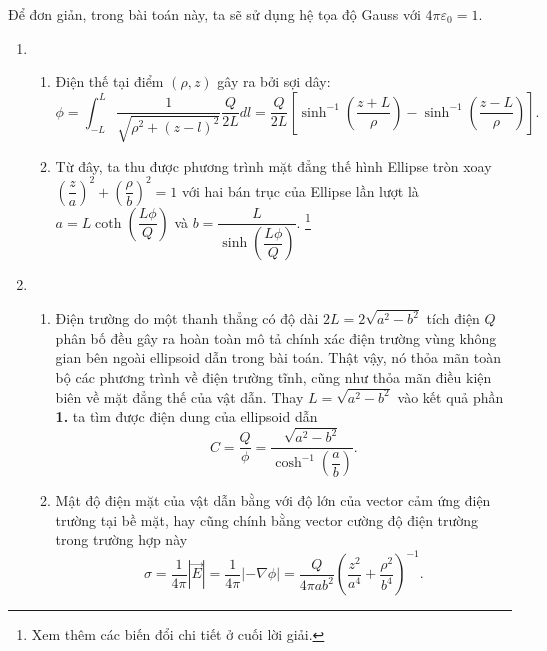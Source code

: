Để đơn giản, trong bài toán này, ta sẽ sử dụng hệ tọa độ Gauss với $4 \pi \varepsilon_0 = 1$.
\begin{enumerate}
    \item 
    \begin{enumerate}[label=\textbf{\alph*,}]\itemsep0em
        \item Điện thế tại điểm $(\rho,z)$ gây ra bởi sợi dây:
    \begin{equation} \label{eq1_ellipsoid_conductor}
        \phi = \int_{-L}^{L} \dfrac{1}{\sqrt{\rho^2+(z-l)^2}} \dfrac{Q}{2L} dl = \dfrac{Q}{2L} \left[ \sinh^{-1}\left(\dfrac{z+L}{\rho}\right)-\sinh^{-1}\left(\dfrac{z-L}{\rho}\right) \right].
    \end{equation}
    \item 
    Từ đây, ta thu được phương trình mặt đẳng thế hình Ellipse tròn xoay $ \left( \dfrac{z}{a} \right)^2 + \left( \dfrac{\rho}{b} \right)^2 = 1$ với hai bán trục của Ellipse lần lượt là $a = L \coth \left( \dfrac{L \phi}{Q} \right)$ và $b = \dfrac{L}{ \sinh \left( \dfrac{L \phi}{Q} \right)}$. \footnote{Xem thêm các biến đổi chi tiết ở cuối lời giải.} \\
    \end{enumerate}
    \item
    \begin{enumerate}[label=\textbf{\alph*,}]\itemsep0em
        \item Điện trường do một thanh thẳng có độ dài $2L=2\sqrt{a^2-b^2}$ tích điện $Q$ phân bố đều gây ra hoàn toàn mô tả chính xác điện trường vùng không gian bên ngoài ellipsoid dẫn trong bài toán. Thật vậy, nó thỏa mãn toàn bộ các phương trình về điện trường tĩnh, cũng như thỏa mãn điều kiện biên về mặt đẳng thế của vật dẫn. Thay $L=\sqrt{a^2-b^2}$ vào kết quả phần \textbf{1.} ta tìm được điện dung của ellipsoid dẫn
        \begin{equation} \label{eq2_ellipsoid_conductor}
            C=\dfrac{Q}{\phi} = \dfrac{\sqrt{a^2-b^2}}{ \cosh^{-1} \left( \dfrac{a}{b} \right)}.
        \end{equation}
        \item Mật độ điện mặt của vật dẫn bằng với độ lớn của vector cảm ứng điện trường tại bề mặt, hay cũng chính bằng vector cường độ điện trường trong trường hợp này
        \begin{equation} \label{eq3_ellipsoid_conductor}
            \sigma = \dfrac{1}{4\pi} \left| \Vec{E} \right| = \dfrac{1}{4\pi} \left| - \nabla \phi \right| = \dfrac{Q}{4 \pi ab^2} \left( \dfrac{z^2}{a^4} + \dfrac{\rho^2}{b^4} \right)^{-1}.
        \end{equation}
    \end{enumerate}
\end{enumerate}

